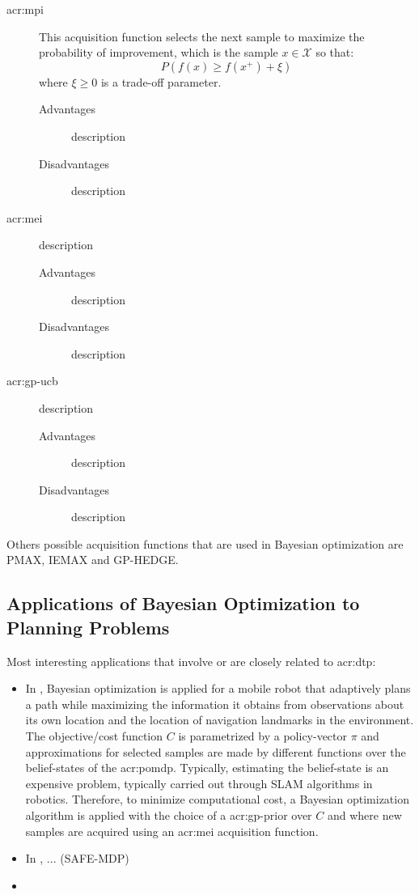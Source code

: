 \begin{description}
	\item[\acrfull{acr:mpi}] This acquisition function selects the next sample to maximize the probability of improvement, which is the sample $x \in \mathcal{X}$ so that:
	$$P(f(x) \geq f(x^+) + \xi)$$
	where $\xi \geq 0$ is a trade-off parameter.
	\begin{description}
		\item[Advantages] description
		\item[Disadvantages] description
	\end{description}
	\item[\acrfull{acr:mei}] description
	\begin{description}
		\item[Advantages] description
		\item[Disadvantages] description
	\end{description}
	\item[\acrfull{acr:gp-ucb}] description
	\begin{description}
		\item[Advantages] description
		\item[Disadvantages] description
	\end{description}
\end{description}

Others possible acquisition functions that are used in Bayesian optimization are PMAX, IEMAX and GP-HEDGE. %

\subsection{Applications of Bayesian Optimization to Planning Problems}
\label{sec:bayesian-optimization-applications}

Most interesting applications that involve or are closely related to \acrshort{acr:dtp}:
\begin{itemize}
	\item In \cite{MartinezCantin2009}, Bayesian optimization is applied for a mobile robot that adaptively plans a path while maximizing the information it obtains from observations about its own location and the location of navigation landmarks in the environment.
	The objective/cost function $C$ is parametrized by a policy-vector $\pi$ and approximations for selected samples are made by different functions over the belief-states of the \acrshort{acr:pomdp}.
	Typically, estimating the belief-state is an expensive problem, typically carried out through SLAM algorithms in robotics.
	Therefore, to minimize computational cost, a Bayesian optimization algorithm is applied with the choice of a \acrshort{acr:gp}-prior over $C$ and where new samples are acquired using an \acrshort{acr:mei} acquisition function.
	\item In \cite{Moldovan2012}, ... (SAFE-MDP)
	\item 
\end{itemize}

